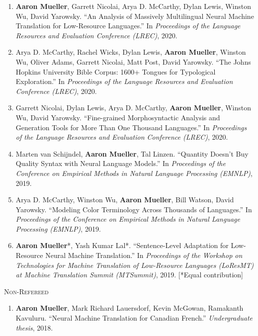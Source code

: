 \documentclass[10pt]{article}
\newcommand{\halfblankline}{\quad\vspace{-0.5\baselineskip}\pagebreak[3]}
\begin{document}
\begin{enumerate}[leftmargin=*, topsep=0pt, itemsep=-1ex, partopsep=0ex, parsep=1ex]
	\item \textbf{Aaron Mueller}, Garrett Nicolai, Arya D. McCarthy, Dylan Lewis, Winston Wu, David Yarowsky. ``An Analysis of Massively Multilingual Neural Machine Translation for Low-Resource Languages.'' In \emph{Proceedings of the Language Resources and Evaluation Conference (LREC)}, 2020.

	\item Arya D. McCarthy, Rachel Wicks, Dylan Lewis, \textbf{Aaron Mueller}, Winston Wu, Oliver Adams, Garrett Nicolai, Matt Post, David Yarowsky. ``The Johns Hopkins University Bible Corpus: 1600+ Tongues for Typological Exploration.'' In \emph{Proceedings of the Language Resources and Evaluation Conference (LREC)}, 2020.

	\item Garrett Nicolai, Dylan Lewis, Arya D. McCarthy, \textbf{Aaron Mueller}, Winston Wu, David Yarowsky. ``Fine-grained Morphosyntactic Analysis and Generation Tools for More Than One Thousand Languages.'' In \emph{Proceedings of the Language Resources and Evaluation Conference (LREC)}, 2020.

	\item Marten van Schijndel, \textbf{Aaron Mueller}, Tal Linzen. ``Quantity Doesn't Buy Quality Syntax with Neural Language Models.'' In \emph{Proceedings of the Conference on Empirical Methods in Natural Language Processing (EMNLP)}, 2019.

	\item Arya D. McCarthy, Winston Wu, \textbf{Aaron Mueller}, Bill Watson, David Yarowsky. ``Modeling Color Terminology Across Thousands of Languages.'' In \emph{Proceedings of the Conference on Empirical Methods in Natural Language Processing (EMNLP)}, 2019.

	\item \textbf{Aaron Mueller}*, Yash Kumar Lal*. ``Sentence-Level Adaptation for Low-Resource Neural Machine Translation.'' In \emph{Proceedings of the Workshop on Technologies for Machine Translation of Low-Resource Languages (LoResMT) at Machine Translation Summit (MTSummit)}, 2019. [*Equal contribution]
	\end{enumerate}



	\halfblankline

	\textsc{Non-Refereed}
	\begin{enumerate}[resume,leftmargin=*, topsep=0pt, itemsep=-1ex, partopsep=0ex, parsep=1ex]
	\item \textbf{Aaron Mueller}, Mark Richard Lauersdorf, Kevin McGowan, Ramakanth Kavuluru. ``Neural Machine Translation for Canadian French.'' \emph{Undergraduate thesis}, 2018.
	\end{enumerate}
\end{document}
